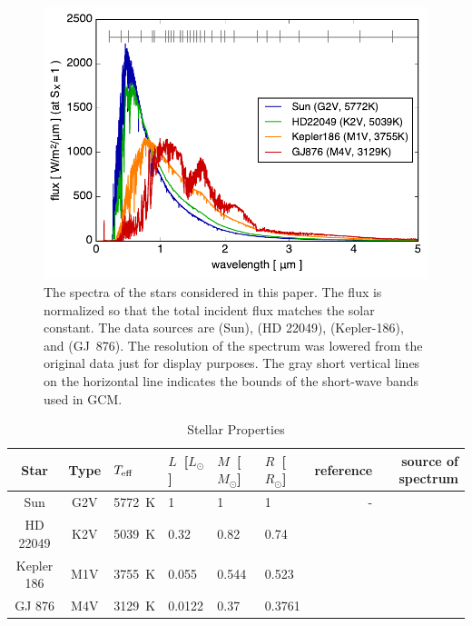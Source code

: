 \documentclass[11pt,numberedappendix,twocolappendix,]{emulateapj}
\begin{document}
\begin{figure}[!bh]
    \begin{center}
    \includegraphics[width=\hsize]{fig/star_spectra.pdf}
    \end{center}
\caption{The spectra of the stars considered in this paper. The flux is normalized so that the total incident flux matches the solar constant. The data sources are \citet{Kurucz1995} (Sun), \citet{Segura2003} (HD 22049), \citet{Allard2012} (Kepler-186), and \citet{Domagal-Goldman2014} (GJ~876). The resolution of the spectrum was lowered from the original data just for display purposes. The gray short vertical lines on the horizontal line indicates the bounds of the short-wave bands used in GCM. }
\label{fig:star_spectra}
\end{figure}



\begin{table}[btp]
\caption{Stellar Properties}
\begin{center}
\begin{tabular}{ccllllrr} \hline \hline
%
Star & Type & $T_{\rm eff}$ & $L$~[$L_{\odot}$] & $M$~[$M_{\odot}$] & $R$~[$R_{\odot}$] & reference & source of spectrum \\ \hline
%
Sun & G2V & 5772~K & 1 & 1 & 1 & - & \citet{Kurucz1995} \\ 
%
HD 22049 & K2V & 5039~K & 0.32 & 0.82 & 0.74 & \citet{Baines2012} & \citet{Segura2003} \\
%
Kepler 186 & M1V & 3755~K & 0.055 & 0.544 & 0.523 & \citet{Torres2015} & \citet{Allard2012} \\
%
GJ 876 & M4V & 3129~K & 0.0122 & 0.37 & 0.3761 & \citet{vonBraun2014} & \citet{Domagal-Goldman2014} \\ \hline
\end{tabular}
\end{center}
\label{tbl:stellar_properties}
\end{table}%
\end{document}

